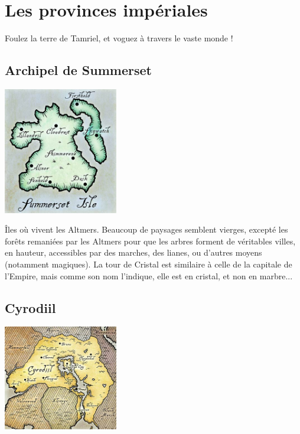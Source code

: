 \chapter{Les provinces impériales}

Foulez la terre de Tamriel, et voguez à travers le vaste monde !

\section{Archipel de Summerset}

\begin{center}
\includegraphics[width=5cm]{images/map_summerset.jpg}
\end{center}

Îles où vivent les Altmers. Beaucoup de paysages semblent vierges, excepté les forêts remaniées par les Altmers pour que les arbres forment de véritables villes, en hauteur, accessibles par des marches, des lianes, ou d'autres moyens (notamment magiques). La tour de Cristal est similaire à celle de la capitale de l'Empire, mais comme son nom l'indique, elle est en cristal, et non en marbre...

\section{Cyrodiil}

\begin{center}
\includegraphics[width=5cm]{images/map_cyrodiil.jpg}
\end{center}

